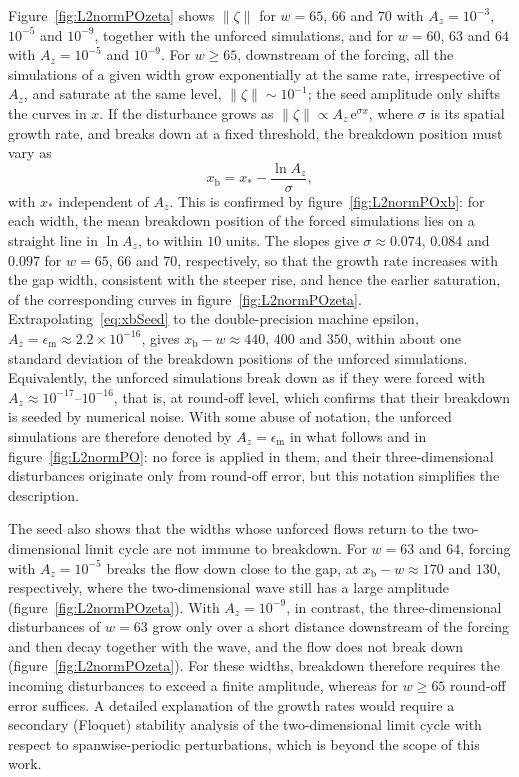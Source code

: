 \documentclass[lineno]{jfm}
\begin{document}
Figure~\ref{fig:L2normPOzeta} shows $\|\zeta\|$ for $w=65$, $66$ and $70$ with $A_z=10^{-3}$, $10^{-5}$ and $10^{-9}$, together with the unforced simulations, and for $w=60$, $63$ and $64$ with $A_z=10^{-5}$ and $10^{-9}$. For $w\geq65$, downstream of the forcing, all the simulations of a given width grow exponentially at the same rate, irrespective of $A_z$, and saturate at the same level, $\|\zeta\|\sim10^{-1}$; the seed amplitude only shifts the curves in $x$. If the disturbance grows as $\|\zeta\|\propto A_z\,\mathrm{e}^{\sigma x}$, where $\sigma$ is its spatial growth rate, and breaks down at a fixed threshold, the breakdown position must vary as
\begin{equation}\label{eq:xbSeed}
	x_\mathrm{b} = x_\ast - \frac{\ln A_z}{\sigma},
\end{equation}
with $x_\ast$ independent of $A_z$. This is confirmed by figure~\ref{fig:L2normPOxb}: for each width, the mean breakdown position of the forced simulations lies on a straight line in $\ln A_z$, to within $10$ units. The slopes give $\sigma\approx0.074$, $0.084$ and $0.097$ for $w=65$, $66$ and $70$, respectively, so that the growth rate increases with the gap width, consistent with the steeper rise, and hence the earlier saturation, of the corresponding curves in figure~\ref{fig:L2normPOzeta}. Extrapolating~\eqref{eq:xbSeed} to the double-precision machine epsilon, $A_z=\epsilon_\mathrm{m}\approx2.2\times10^{-16}$, gives $x_\mathrm{b}-w\approx440$, $400$ and $350$, within about one standard deviation of the breakdown positions of the unforced simulations. Equivalently, the unforced simulations break down as if they were forced with $A_z\approx10^{-17}$--$10^{-16}$, that is, at round-off level, which confirms that their breakdown is seeded by numerical noise. With some abuse of notation, the unforced simulations are therefore denoted by $A_z=\epsilon_\mathrm{m}$ in what follows and in figure~\ref{fig:L2normPO}: no force is applied in them, and their three-dimensional disturbances originate only from round-off error, but this notation simplifies the description.

The seed also shows that the widths whose unforced flows return to the two-dimensional limit cycle are not immune to breakdown. For $w=63$ and $64$, forcing with $A_z=10^{-5}$ breaks the flow down close to the gap, at $x_\mathrm{b}-w\approx170$ and $130$, respectively, where the two-dimensional wave still has a large amplitude (figure~\ref{fig:L2normPOzeta}). With $A_z=10^{-9}$, in contrast, the three-dimensional disturbances of $w=63$ grow only over a short distance downstream of the forcing and then decay together with the wave, and the flow does not break down (figure~\ref{fig:L2normPOzeta}). For these widths, breakdown therefore requires the incoming disturbances to exceed a finite amplitude, whereas for $w\geq65$ round-off error suffices. A detailed explanation of the growth rates would require a secondary (Floquet) stability analysis of the two-dimensional limit cycle with respect to spanwise-periodic perturbations, which is beyond the scope of this work.
\end{document}
